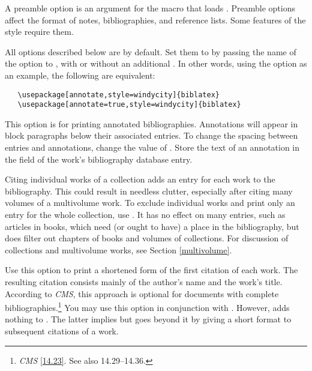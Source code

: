 \documentclass[11pt,letterpaper,oneside]{article}
\begin{document}
A preamble option is an argument for the  macro that
loads \biblatex. Preamble options affect the format of notes,
bibliographies, and reference lists. Some features of the style
require them.

All options described below are  by default. Set them to
 by passing the name of the option to \biblatex, with or
without an additional . In other words, using the option
 as an example, the following are equivalent:

\begin{verbatim}
   \usepackage[annotate,style=windycity]{biblatex}
   \usepackage[annotate=true,style=windycity]{biblatex}
\end{verbatim}

\begin{optionlist}


\noindent This option is for printing annotated bibliographies.
Annotations will appear in block paragraphs below their associated
entries. To change the spacing between entries and annotations, change
the value of . Store the text of an annotation in the
 field of the work's bibliography database entry.


\noindent Citing individual works of a collection adds an entry for
each work to the bibliography. This could result in needless clutter,
especially after citing many volumes of a multivolume work. To exclude
individual works and print only an entry for the whole collection, use
. It has no effect on many 
entries, such as articles in books, which need (or ought to have) a
place in the bibliography, but does filter out chapters of books and
volumes of collections. For discussion of collections and multivolume
works, see Section \ref{multivolume}.


\noindent Use this option to print a shortened form of the first
citation of each work. The resulting citation consists mainly of the
author's name and the work's title. According to \textit{CMS}, this
approach is optional for documents with complete
bibliographies.\footnote{\textit{CMS} \ref{14.23}. See also
14.29--14.36.} You may use this option in conjunction with .
However,  adds nothing to . The latter
implies  but goes beyond it by giving a short format
to subsequent citations of a work.


\end{optionlist}
\end{document}
